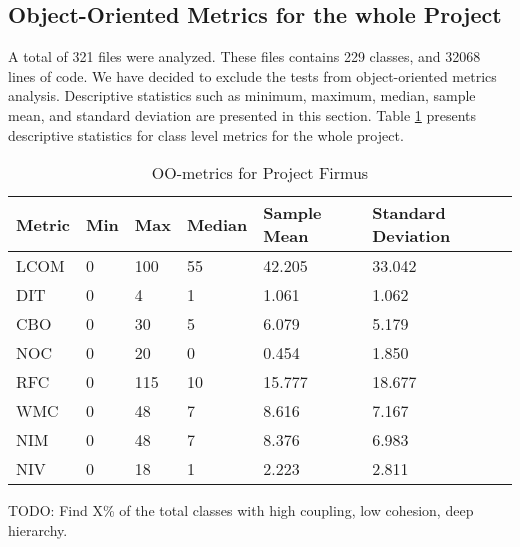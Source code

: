 \subsection{Object-Oriented Metrics for the whole Project}
A total of 321 files were analyzed. These files contains 229 classes, and 32068 lines of code. We have decided to exclude the tests from object-oriented metrics analysis. Descriptive statistics such as minimum, maximum, median, sample mean, and standard deviation are presented in this section. Table \ref{tab:oometrics-firmus} presents descriptive statistics for class level metrics for the whole project.

\begin{table}[]
\centering
\caption{OO-metrics for Project Firmus}
\label{tab:oometrics-firmus}
\begin{tabular}{|l|l|l|l|l|l|}
\hline
\textbf{Metric} & \textbf{Min} & \textbf{Max} & \textbf{Median} & \textbf{Sample Mean} & \textbf{Standard Deviation} \\ \hline
LCOM            & 0            & 100          & 55              & 42.205               & 33.042                      \\ \hline
DIT             & 0            & 4            & 1               & 1.061                & 1.062                       \\ \hline
CBO             & 0            & 30           & 5               & 6.079                & 5.179                       \\ \hline
NOC             & 0            & 20           & 0               & 0.454                & 1.850                       \\ \hline
RFC             & 0            & 115          & 10              & 15.777               & 18.677                      \\ \hline
WMC             & 0            & 48           & 7               & 8.616                & 7.167                       \\ \hline
NIM             & 0            & 48           & 7               & 8.376                & 6.983                       \\ \hline
NIV             & 0            & 18           & 1               & 2.223                & 2.811                       \\ \hline
\end{tabular}
\end{table}

TODO: Find X\% of the total classes with high coupling, low cohesion, deep hierarchy. 

